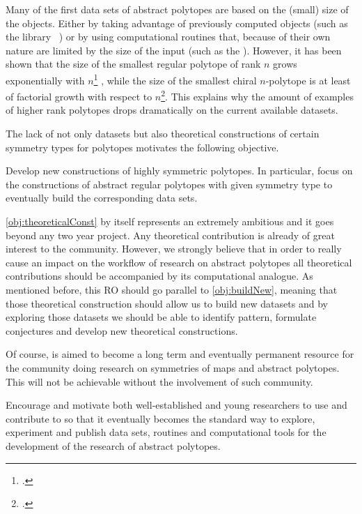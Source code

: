 Many of the first data sets of abstract polytopes are based on the (small) size of the objects.
Either by taking advantage of previously computed objects (such as the library \smallgrp\ ) or by using computational routines that, because of their own nature are limited by the size of the input (such as the \lins).
However, it has been shown that the size of the smallest regular polytope of rank $n$ grows exponentially with $n$\footcite{Conder_2013_SmallestRegularPolytopes} , while the size of the smallest chiral $n$-polytope is at least of factorial growth with respect to $n$\footcite{Cunningham_2017_NonFlatRegular}.
This explains why the amount of examples of higher rank polytopes drops dramatically on the current available datasets.

The lack of not only datasets but also theoretical constructions of certain symmetry types for polytopes motivates the following objective.

\begin{obj}\label{obj:theoreticalConst}
Develop new constructions of highly symmetric polytopes. In particular, focus on the constructions of abstract regular polytopes with given symmetry type to eventually build the corresponding data sets.
\end{obj}

\cref{obj:theoreticalConst} by itself represents an extremely ambitious and it goes beyond any two year project.
Any theoretical contribution is already of great interest to the community.
However, we strongly believe that in order to really cause an impact on the workflow of research on abstract polytopes all theoretical contributions should be accompanied by its computational analogue.
As mentioned before, this RO should go parallel to \cref{obj:buildNew}, meaning that those theoretical construction should allow us to build new datasets and by exploring those datasets we should be able to identify pattern, formulate conjectures and develop new theoretical constructions.

Of course, \ourp  is aimed to become a long term and eventually permanent resource for the community doing research on symmetries of maps and abstract polytopes.
This will not be achievable without the involvement of such community.

\begin{obj}\label{obj:usage}
Encourage and motivate both well-established and young researchers to use and contribute to \ourp  so that it eventually becomes the standard way to explore, experiment and publish data sets, routines and computational tools for the development of the research of abstract polytopes.
\end{obj}

